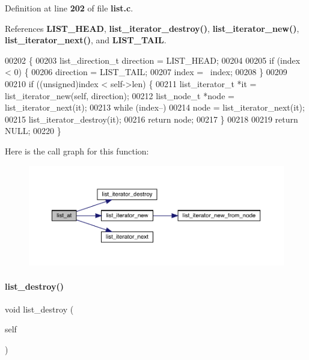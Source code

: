 Definition at line \textbf{ 202} of file \textbf{ list.\+c}.



References \textbf{ L\+I\+S\+T\+\_\+\+H\+E\+AD}, \textbf{ list\+\_\+iterator\+\_\+destroy()}, \textbf{ list\+\_\+iterator\+\_\+new()}, \textbf{ list\+\_\+iterator\+\_\+next()}, and \textbf{ L\+I\+S\+T\+\_\+\+T\+A\+IL}.


\begin{DoxyCode}
00202                                               \{
00203   list_direction_t direction = LIST_HEAD;
00204 
00205   \textcolor{keywordflow}{if} (index < 0) \{
00206     direction = LIST_TAIL;
00207     index = ~index;
00208   \}
00209 
00210   \textcolor{keywordflow}{if} ((\textcolor{keywordtype}{unsigned})index < self->len) \{
00211     list_iterator_t *it = list_iterator_new(\textcolor{keyword}{self}, direction);
00212     list_node_t *node = list_iterator_next(it);
00213     \textcolor{keywordflow}{while} (index--)
00214       node = list_iterator_next(it);
00215     list_iterator_destroy(it);
00216     \textcolor{keywordflow}{return} node;
00217   \}
00218 
00219   \textcolor{keywordflow}{return} NULL;
00220 \}
\end{DoxyCode}
Here is the call graph for this function\+:\nopagebreak
\begin{figure}[H]
\begin{center}
\leavevmode
\includegraphics[width=350pt]{list_8c_ab3dacc64ceb63b0a0849312b0a14c91c_cgraph}
\end{center}
\end{figure}
\mbox{\label{list_8c_ac2d2be572a896cccd0e76d56eeefcbdb}} 
\paragraph{list\+\_\+destroy()}
{\footnotesize\ttfamily void list\+\_\+destroy (\begin{DoxyParamCaption}\item[{\textbf{ list\+\_\+t} $\ast$}]{self }\end{DoxyParamCaption})}



